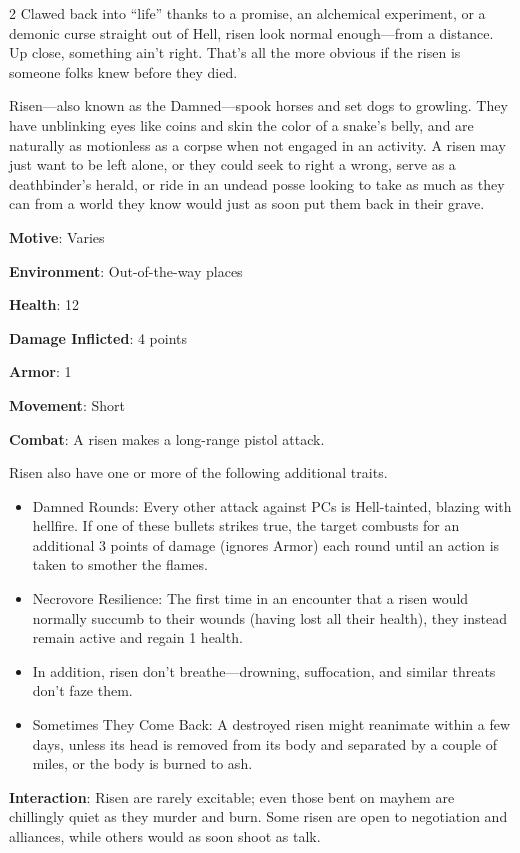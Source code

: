 \begin{multicols}{2}
Clawed back into “life” thanks to a promise, an alchemical experiment, or a demonic curse straight out of Hell, risen look normal enough—from a distance. Up close, something ain’t right. That’s all the more obvious if the risen is someone folks knew before they died. 

Risen—also known as the Damned—spook horses and set dogs to growling. They have unblinking eyes like coins and skin the color of a snake’s belly, and are naturally as motionless as a corpse when not engaged in an activity. A risen may just want to be left alone, or they could seek to right a wrong, serve as a deathbinder’s herald, or ride in an undead posse looking to take as much as they can from a world they know would just as soon put them back in their grave.

\textbf{Motive}: Varies 

\textbf{Environment}: Out-of-the-way places 

\textbf{Health}: 12 

\textbf{Damage Inflicted}: 4 points 

\textbf{Armor}: 1 

\textbf{Movement}: Short 

\textbf{Combat}: A risen makes a long-range pistol attack. 

Risen also have one or more of the following additional traits. 
\begin{itemize}
\item 	Damned Rounds: Every other attack against PCs is Hell-tainted, blazing with hellfire. If one of these bullets strikes true, the target combusts for an additional 3 points of damage (ignores Armor) each round until an action is taken to smother the flames. 
\item 	Necrovore Resilience: The first time in an encounter that a risen would normally succumb to their wounds (having lost all their health), they instead remain active and regain 1 health. 
\item 	In addition, risen don’t breathe—drowning, suffocation, and similar threats don’t faze them. 
\item 	Sometimes They Come Back: A destroyed risen might reanimate within a few days, unless its head is removed from its body and separated by a couple of miles, or the body is burned to ash. 
\end{itemize}

\textbf{Interaction}: Risen are rarely excitable; even those bent on mayhem are chillingly quiet as they murder and burn. Some risen are open to negotiation and alliances, while others would as soon shoot as talk. 


\end{multicols}
